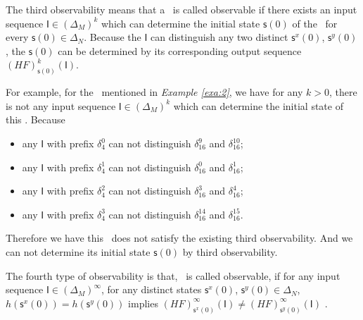 The third observability means that a \BCN\ is called observable if there exists an input sequence $\mathsf{I}\in(\Delta_M)^k$ which can determine the initial state $\mathsf{s}(0)$ of the \BCN\ for every $\mathsf{s}(0)\in\Delta_N$. Because the $\mathsf{I}$ can distinguish any two distinct $\mathsf{s}^{x}(0)$, $\mathsf{s}^{y}(0)$, the $\mathsf{s}(0)$ can be determined by its corresponding output sequence $(HF)^k_{\mathsf{s}(0)}(\mathsf{I})$.

\begin{example}
For example, for the \BCN\ mentioned in {\em Example \ref{exa:2}}, we have for any $k>0$, there is not any input sequence $\mathsf{I}\in(\Delta_M)^k$ which can determine the initial state of this \BCN. Because 
\begin{itemize}
  \item any $\mathsf{I}$ with prefix $\delta_{4}^0$ can not distinguish $\delta_{16}^9$ and $\delta_{16}^{10}$;
  \item any $\mathsf{I}$ with prefix $\delta_{4}^1$ can not distinguish $\delta_{16}^0$ and $\delta_{16}^{1}$;
  \item any $\mathsf{I}$ with prefix $\delta_{4}^2$ can not distinguish $\delta_{16}^3$ and $\delta_{16}^{4}$;
  \item any $\mathsf{I}$ with prefix $\delta_{4}^3$ can not distinguish $\delta_{16}^{14}$ and $\delta_{16}^{15}$.
\end{itemize} 



Therefore we have this \BCN\ does not satisfy the existing third observability. And we can not determine its initial state $\mathsf{s}(0)$ by third observability. 
\label{exa:6}
\end{example}  
\begin{definition}
	The fourth type of observability is that, \BCN\ is called observable, if for any input sequence $\mathsf{I}\in(\Delta_M)^{\infty}$, for any distinct states $\mathsf{s}^{x}(0)$, $\mathsf{s}^{y}(0) \in \Delta_N$, $h(\mathsf{s}^{x}(0))=h(\mathsf{s}^{y}(0))$ implies $(HF)^{\infty}_{\mathsf{s}^{x}(0)}(\mathsf{I})\neq (HF)^{\infty}_{\mathsf{s}^{y}(0)}(\mathsf{I})$ \cite{Fornasini2013Observability}.
\end{definition}

